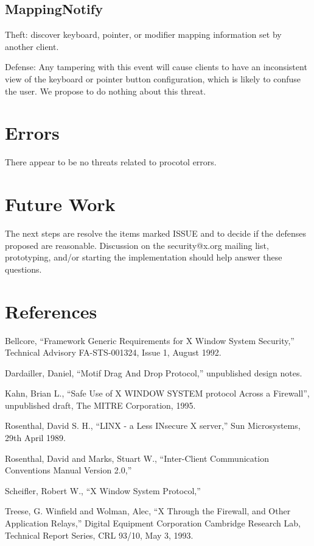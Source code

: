 \subsection{MappingNotify}

Theft: discover keyboard, pointer, or modifier mapping information
set by another client.

Defense: Any tampering with this event will cause clients to have an
inconsistent view of the keyboard or pointer button configuration,
which is likely to confuse the user.  We propose to do nothing about
this threat.


\section{Errors}

There appear to be no threats related to procotol errors.



\section{Future Work}

The next steps are resolve the items marked ISSUE and to decide if the
defenses proposed are reasonable.  Discussion on the security@x.org
mailing list, prototyping, and/or starting the implementation should
help answer these questions.



\section{References}

Bellcore, ``Framework Generic Requirements for X Window System Security,''
Technical Advisory FA-STS-001324, Issue 1, August 1992.

Dardailler, Daniel, ``Motif Drag And Drop Protocol,'' unpublished
design notes.

Kahn, Brian L., ``Safe Use of X WINDOW SYSTEM protocol Across a
Firewall'', unpublished draft, The MITRE Corporation, 1995.

Rosenthal, David S. H., ``LINX - a Less INsecure X server,'' Sun Microsystems,
29th April 1989.

Rosenthal, David and Marks, Stuart W., ``Inter-Client Communication
Conventions Manual Version 2.0,''

Scheifler, Robert W., ``X Window System Protocol,''

Treese, G. Winfield and Wolman, Alec, ``X Through the Firewall, and
Other Application Relays,'' Digital Equipment Corporation Cambridge
Research Lab, Technical Report Series, CRL 93/10, May 3, 1993.


